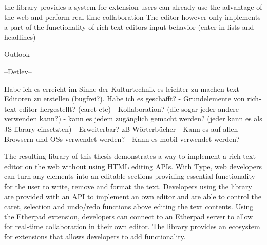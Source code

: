 
\iffalse



the library provides a system for extension
users can already use the advantage of the web and perform real-time collaboration
The editor however only implements a part of the functionality of rich text editors
input behavior (enter in lists and headlines)

Outlook

--Detlev--

Habe ich es erreicht im Sinne der Kulturtechnik es leichter zu machen text Editoren zu erstellen (bugfrei?).
Habe ich es geschafft?
 - Grundelemente von rich-text editor hergestellt? (caret etc)
 - Kollaboration? (die sogar jeder andere verwenden kann?)
 - kann es jedem zugänglich gemacht werden? (jeder kann es als JS library einsetzten)
 - Erweiterbar? zB Wörterbücher
 - Kann es auf allen Browsern und OSs verwendet werden?
 - Kann es mobil verwendet werden?





The resulting library of this thesis demonstrates a way to implement a rich-text editor on the web without using HTML editing APIs. With Type, web developers can turn any elements into an editable sections providing essential functionality for the user to write, remove and format the text. Developers using the library are provided with an API to implement an own editor and are able to control the caret, selection and undo/redo functions above editing the text contents. Using the Etherpad extension, developers can connect to an Etherpad server to allow for real-time collaboration in their own editor. The library provides an ecosystem for extensions that allows developers to add functionality.


